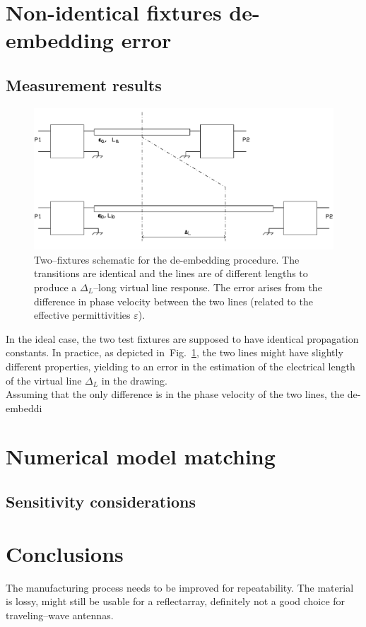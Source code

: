 \documentclass[11pt,a4paper]{article}
\newcommand{\fig}[1]{Fig.~\ref{#1}}
\begin{document}
    \section{Non-identical fixtures de-embedding error}
    \label{sec:error}

    \subsection{Measurement results}
    \label{subsec:measure-error}
    \begin{figure}[!tb]
        \includegraphics[width=\textwidth]{error}
        \caption{Two--fixtures schematic for the de-embedding procedure. The transitions are identical and the lines are
        of different lengths to produce a $\Delta_L$--long virtual line response. The error arises from the difference
        in phase velocity between the two lines (related to the effective permittivities $\varepsilon$).}
        \label{fig:error}
    \end{figure}
    In the ideal case, the two test fixtures are supposed to have identical propagation constants.
    In practice, as depicted in~\fig{fig:error}, the two lines might have slightly different properties, yielding
    to an error in the estimation of the electrical length of the virtual line $\Delta_L$ in the drawing.\\
    Assuming that the only difference is in the phase velocity of the two lines, the de-embeddi


    \section{Numerical model matching}
    \label{sec:numerical-model-matching}

    \subsection{Sensitivity considerations}
    \label{subsec:sensitivity}


    \section{Conclusions}
    \label{sec:conclusion}
    The manufacturing process needs to be improved for repeatability.
    The material is lossy, might still be usable for a reflectarray, definitely not a good choice for traveling--wave antennas.

    \clearpage
    
    
\end{document}
